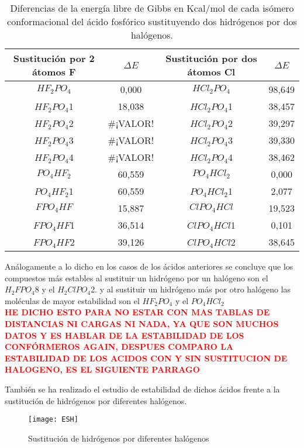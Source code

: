 \begin{table}[H]
	\centering
	\begin{tabular}{|c|c|c|c|}
		\hline
		Sustitución por 2 átomos F & $\Delta E$   & Sustitución por dos átomos Cl & $\Delta E$     \\ \hline
		$HF_2PO_4$  & 0,000     & $HCl_2PO_4$     & 98,649 \\ \hline
		$HF_2PO_4$1  & 18,038    & $HCl_2PO_4$1   & 38,457 \\ \hline
		$HF_2PO_4$2   & \#¡VALOR! & $HCl_2PO_4$2    & 39,297 \\ \hline
		$HF_2PO_4$3   & \#¡VALOR! & $HCl_2PO_4$3    & 39,330 \\ \hline
		$HF_2PO_4$4   & \#¡VALOR! & $HCl_2PO_4$4  & 38,462 \\ \hline
		$PO_4HF_2$    & 60,559    & $PO_4HCl_2$  & 0,000  \\ \hline
		$PO_4HF_2$1   & 60,559    & $PO_4HCl_2$1   & 2,077  \\ \hline
		$FPO_4HF$    & 15,887    & $ClPO_4HCl$  & 19,523 \\ \hline
		$FPO_4HF$1   & 36,514    & $ClPO_4HCl$1   & 0,101  \\ \hline
		$FPO_4HF$2  & 39,126    & $ClPO_4HCl$2   & 38,645 \\ \hline
	\end{tabular}
\caption{Diferencias de la energía libre de Gibbs en Kcal/mol de cada isómero conformacional del ácido fosfórico sustituyendo dos hidrógenos por dos halógenos.}
\end{table}
 Análogamente a lo dicho en los casos de los ácidos anteriores se concluye que los compuestos más estables al sustituir un hidrógeno por un halógeno son el $H_2FPO_4$8 y el $H_2ClPO_4$2. y al sustituir un hidrógeno más por otro halógeno las moléculas de mayor estabilidad son el $HF_2PO_4$ y el $PO_4HCl_2$\\
 
 {\bfseries\textcolor{red} {HE DICHO ESTO PARA NO ESTAR CON MAS TABLAS DE DISTANCIAS NI CARGAS NI NADA, YA QUE SON MUCHOS DATOS Y ES HABLAR DE LA ESTABILIDAD DE LOS CONFÓRMEROS AGAIN, DESPUES COMPARO LA ESTABILIDAD DE LOS ACIDOS CON Y SIN SUSTITUCION DE HALOGENO, ES EL SIGUIENTE PARRAGO}}

También se ha realizado el estudio de estabilidad de dichos ácidos frente a la sustitución de hidrógenos por diferentes halógenos.
\begin{figure}[h]
	\centering
	\texttt{[image: ESH]}
	\caption{Sustitución de hidrógenos por diferentes halógenos}
\end{figure}

